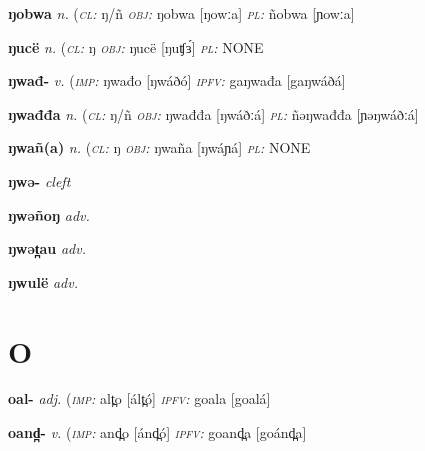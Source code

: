 {\newentry
\headword\textbf{ŋobwa}  
\ipa{[ŋowːa]}  
\synpos\textit{n.} 
\class(\textit{\textsc{cl:}} {ŋ/ñ}
\object\textit{\textsc{obj:}} ŋobwa [ŋowːa]
\plural\textit{\textsc{pl:}} ñobwa [ɲowːa]

\newentry
\headword\textbf{ŋucë}  
\ipa{[ŋuʧɜ́]}  
\synpos\textit{n.} 
\class(\textit{\textsc{cl:}} {ŋ}
\object\textit{\textsc{obj:}} ŋucë [ŋuʧɜ́]
\plural\textit{\textsc{pl:}} NONE

\newentry
\headword\textbf{ŋwađ-}  
\ipa{[ŋwáð-]}
\synpos\textit{v.} 
\imperative(\textit {\textsc{imp:}} ŋwađo [ŋwáðó]
\imperfective\textit{\textsc{ipfv:}} gaŋwađa [gaŋwáðá] 

\newentry
\headword\textbf{ŋwađđa}  
\synpos\textit{n.} 
\class(\textit{\textsc{cl:}} {ŋ/ñ}
\object\textit{\textsc{obj:}} ŋwađđa [ŋwáðːá]
\plural\textit{\textsc{pl:}} ñəŋwađđa [ɲəŋwáðːá] %

\newentry
\headword\textbf{ŋwañ(a)}  
\ipa{[ŋwáɲ(á)]}  
\synpos\textit{n.} 
\class(\textit{\textsc{cl:}} {ŋ}
\object\textit{\textsc{obj:}} ŋwaña [ŋwáɲá]
\plural\textit{\textsc{pl:}} NONE

\newentry
\headword\textbf{ŋwə-}  
\ipa{[ŋwə́]}
\synpos\textit{cleft} 

\newentry
\headword\textbf{ŋwəñoŋ}  
\ipa{[ŋwəɲoŋ]}
\synpos\textit{adv.} 

\newentry
\headword\textbf{ŋwət̪au}  
\ipa{[ŋwə́t̪áu]}
\synpos\textit{adv.} 

\newentry
\headword\textbf{ŋwulë}  
\ipa{[ŋwúlɜ́]}
\synpos\textit{adv.} 

\section*{O}\label{O}

\newentry
\headword\textbf{oal-}  
\ipa{[oal-]}
\synpos\textit{adj.} 
\imperative(\textit {\textsc{imp:}} alt̪o [ált̪ó]
\imperfective\textit{\textsc{ipfv:}} goala [goalá] %

\newentry
\headword\textbf{oand̪-}  
\ipa{[oánd̪-]}
\synpos\textit{v.} 
\imperative(\textit {\textsc{imp:}} and̪o [ánd̪ó]
\imperfective\textit{\textsc{ipfv:}} goand̪a [goánd̪a] %

}
